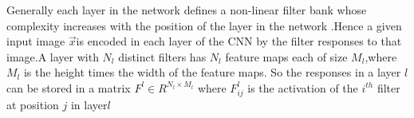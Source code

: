 \documentclass[conference]{IEEEtran}
\begin{document}
Generally each layer in the network defines a non-linear filter bank whose 
complexity increases with the position of the layer in the network .Hence a given input image $\overrightarrow{x}$is encoded in each layer of the CNN by the filter responses to that image.A layer with $N_l$ distinct filters has
$N_l$ feature maps each of size $M_l$,where $M_l$ is the height times 
the width of the feature maps. So the responses in a layer $l$ can be stored in a matrix $F^l \in R^{N_l\times M_l}$ where $F_{ij}^{l}$ is the 
activation of the $i^{th}$ filter at position $j$ in layer$l$
%
%



%
%
\end{document}
